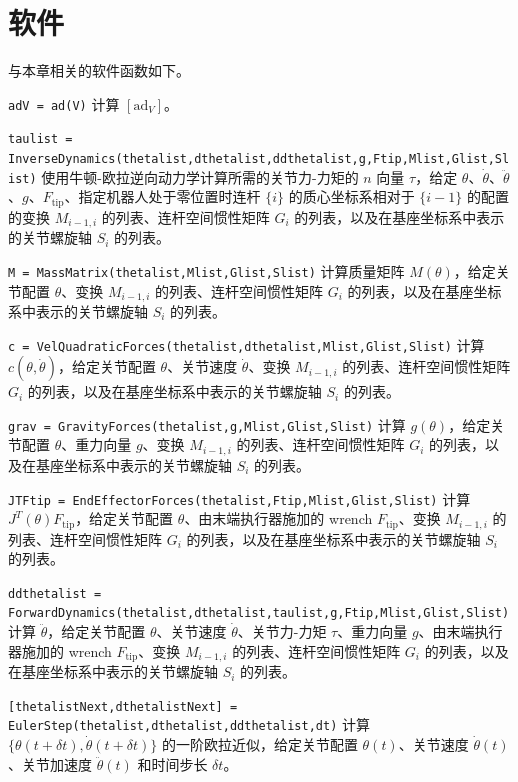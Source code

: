 \documentclass[12pt,a4paper]{article}
\begin{document}
\section{软件}
与本章相关的软件函数如下。

\texttt{adV = ad(V)} 计算 $[\text{ad}_V]$。

\texttt{taulist = InverseDynamics(thetalist,dthetalist,ddthetalist,g,Ftip,Mlist,Glist,Slist)} 使用牛顿-欧拉逆向动力学计算所需的关节力-力矩的 $n$ 向量 $\tau$，给定 $\theta$、$\dot{\theta}$、$\ddot{\theta}$、$g$、$F_{\text{tip}}$、指定机器人处于零位置时连杆 $\{i\}$ 的质心坐标系相对于 $\{i-1\}$ 的配置的变换 $M_{i-1,i}$ 的列表、连杆空间惯性矩阵 $G_i$ 的列表，以及在基座坐标系中表示的关节螺旋轴 $S_i$ 的列表。

\texttt{M = MassMatrix(thetalist,Mlist,Glist,Slist)} 计算质量矩阵 $M(\theta)$，给定关节配置 $\theta$、变换 $M_{i-1,i}$ 的列表、连杆空间惯性矩阵 $G_i$ 的列表，以及在基座坐标系中表示的关节螺旋轴 $S_i$ 的列表。

\texttt{c = VelQuadraticForces(thetalist,dthetalist,Mlist,Glist,Slist)} 计算 $c(\theta, \dot{\theta})$，给定关节配置 $\theta$、关节速度 $\dot{\theta}$、变换 $M_{i-1,i}$ 的列表、连杆空间惯性矩阵 $G_i$ 的列表，以及在基座坐标系中表示的关节螺旋轴 $S_i$ 的列表。

\texttt{grav = GravityForces(thetalist,g,Mlist,Glist,Slist)} 计算 $g(\theta)$，给定关节配置 $\theta$、重力向量 $g$、变换 $M_{i-1,i}$ 的列表、连杆空间惯性矩阵 $G_i$ 的列表，以及在基座坐标系中表示的关节螺旋轴 $S_i$ 的列表。

\texttt{JTFtip = EndEffectorForces(thetalist,Ftip,Mlist,Glist,Slist)} 计算 $J^T(\theta)F_{\text{tip}}$，给定关节配置 $\theta$、由末端执行器施加的 wrench $F_{\text{tip}}$、变换 $M_{i-1,i}$ 的列表、连杆空间惯性矩阵 $G_i$ 的列表，以及在基座坐标系中表示的关节螺旋轴 $S_i$ 的列表。

\texttt{ddthetalist = ForwardDynamics(thetalist,dthetalist,taulist,g,Ftip,Mlist,Glist,Slist)} 计算 $\ddot{\theta}$，给定关节配置 $\theta$、关节速度 $\dot{\theta}$、关节力-力矩 $\tau$、重力向量 $g$、由末端执行器施加的 wrench $F_{\text{tip}}$、变换 $M_{i-1,i}$ 的列表、连杆空间惯性矩阵 $G_i$ 的列表，以及在基座坐标系中表示的关节螺旋轴 $S_i$ 的列表。

\texttt{[thetalistNext,dthetalistNext] = EulerStep(thetalist,dthetalist,ddthetalist,dt)} 计算 $\{\theta(t + \delta t), \dot{\theta}(t + \delta t)\}$ 的一阶欧拉近似，给定关节配置 $\theta(t)$、关节速度 $\dot{\theta}(t)$、关节加速度 $\ddot{\theta}(t)$ 和时间步长 $\delta t$。
\end{document}
